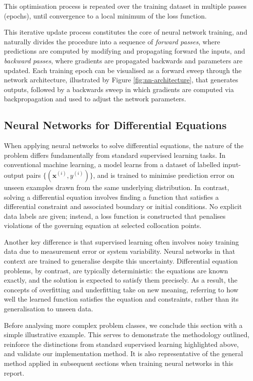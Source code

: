 This optimisation process is repeated over the training dataset in multiple passes 
(epochs), until convergence to a local minimum of the loss function.

This iterative update process constitutes the core of neural network training, and naturally 
divides the procedure into a sequence of \emph{forward passes}, where predictions are computed 
by modifying and propagating forward the inputs, 
and \emph{backward passes}, where gradients are propagated backwards and parameters are updated. Each 
training epoch can be visualised as a forward sweep through the network architecture, illustrated
by Figure \ref{fig:nn-architecture}, that generates outputs, followed by a backwards sweep in which
gradients are computed via backpropagation and used to adjust the network parameters.

\subsection{Neural Networks for Differential Equations}

When applying neural networks to solve differential equations, the nature of the problem differs 
fundamentally from standard supervised learning tasks. In conventional machine learning, a model 
learns from a dataset of labelled input-output pairs 
\( \{ (\mathbf{x}^{(i)}, y^{(i)}) \} \), and is trained to minimise prediction error on unseen
examples drawn from the same underlying distribution. In contrast, solving a differential equation 
involves finding a function that satisfies a differential constraint and associated boundary or 
initial conditions. No explicit data labels are given; instead, a loss function is constructed that 
penalises violations of the governing equation at selected collocation points.

Another key difference is that supervised learning often involves noisy training data due to 
measurement error or system variability. Neural networks in that context are trained to generalise 
despite this uncertainty. Differential equation problems, by contrast, are typically deterministic: 
the equations are known exactly, and the solution is expected to satisfy them precisely. As a result, 
the concepts of overfitting and underfitting take on new meaning, referring to how well the learned 
function satisfies the equation and constraints, rather than its generalisation to unseen data.

Before analysing more complex problem classes, we conclude this section with a simple illustrative 
example. This serves to demonstrate the methodology outlined, reinforce the distinctions 
from standard supervised learning highlighted above, and validate our implementation method. 
It is also representative of the general method applied in subsequent sections when training 
neural networks in this report.

